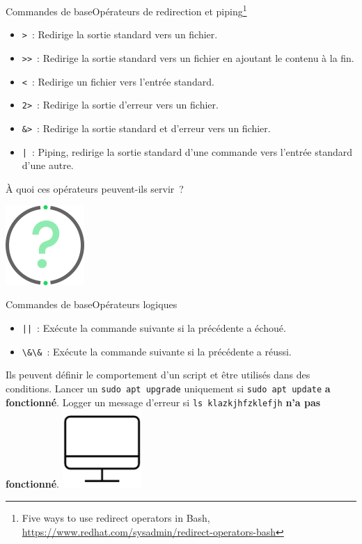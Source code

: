 \documentclass{beamer}
\begin{document}
    \begin{frame}{Commandes de base}{Opérateurs de redirection et piping\footnote{Five ways to use redirect operators in Bash, \url{https://www.redhat.com/sysadmin/redirect-operators-bash}}}
        \begin{footnotesize}
            \begin{itemize}
                \item \lstinline{>}~: Redirige la sortie standard vers un fichier.
                \item \lstinline{>>}~: Redirige la sortie standard vers un fichier en ajoutant le contenu à la fin.
                \item \lstinline{<}~: Redirige un fichier vers l'entrée standard.
                \item \lstinline{2>}~: Redirige la sortie d'erreur vers un fichier.
                \item \lstinline{&>}~: Redirige la sortie standard et d'erreur vers un fichier.
                \item \lstinline{|}~: Piping, redirige la sortie standard d'une commande vers l'entrée standard d'une autre.
            \end{itemize}
            À quoi ces opérateurs peuvent-ils servir~?
            \begin{center}
                \includegraphics[width=3cm]{image/question-mark}
            \end{center}
        \end{footnotesize}
    \end{frame}

    \begin{frame}{Commandes de base}{Opérateurs logiques}
        \begin{itemize}
            \item \lstinline{||}~: Exécute la commande suivante si la précédente a échoué.
            \item \lstinline{\&\&}~: Exécute la commande suivante si la précédente a réussi.
        \end{itemize}
        Ils peuvent définir le comportement d'un script et être utilisés dans des conditions.
        \bigbreak
        Lancer un \lstinline{sudo apt upgrade} uniquement si \lstinline{sudo apt update} \textbf{a fonctionné}.
        \bigbreak
        Logger un message d'erreur si \lstinline{ls klazkjhfzklefjh} \textbf{n'a pas fonctionné}.
        \bigbreak
        \centering
        \includegraphics[width=3cm]{image/desktop}
    \end{frame}
\end{document}
